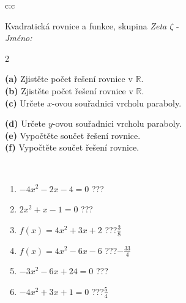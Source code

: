 \documentclass[10pt]{report}
\begin{document}
\begin{tabular}{c:c}
\begin{minipage}[c][104.5mm][t]{0.5\linewidth}
\begin{center}
\vspace{7mm}
{\huge \LARGE Kvadratická rovnice a funkce, skupina \textit{Zeta $\zeta$} -}\\[5mm]
\textit{Jméno:}\phantom{xxxxxxxxxxxxxxxxxxxxxxxxxxxxxxxxxxxxxxxxxxxxxxxxxxxxxxxxxxxxxxxxx}\\[5mm]
\begin{minipage}{0.95\linewidth}
\begin{center}
{\small \begin{multicols}{2} \raggedright
\textbf{(a)} Zjistěte počet řešení rovnice v \(\mathbb{R}\). \\[1mm]
\textbf{(b)} Zjistěte počet řešení rovnice v \(\mathbb{R}\). \\[1mm]
\textbf{(c)} Určete \(x\)-ovou souřadnici vrcholu paraboly. \par \columnbreak
\textbf{(d)} Určete \(y\)-ovou souřadnici vrcholu paraboly. \\[1mm]
\textbf{(e)} Vypočtěte součet řešení rovnice. \\[1mm]
\textbf{(f)} Vypočtěte součet řešení rovnice.
\end{multicols}
}
\end{center}
\end{minipage}
\\[4mm]
\begin{minipage}{0.79\linewidth}
\begin{center}
\begin{varwidth}{\linewidth}
\begin{enumerate}
\Large
\item $-4x^2-2x-4=0$\quad \dotfill\; ???\;\dotfill {}
\item $2x^2+x-1=0$\quad \dotfill\; ???\;\dotfill {}
\item $f(x)=4x^2+3x+2$\quad \dotfill\; ???\;\dotfill \quad $\frac{3}{8}$
\item $f(x)=4x^2-6x-6$\quad \dotfill\; ???\;\dotfill \quad $-\frac{33}{4}$
\item $-3x^2-6x+24=0$\quad \dotfill\; ???\;\dotfill {}
\item $-4x^2+3x+1=0$\quad \dotfill\; ???\;\dotfill \quad $\frac{5}{4}$
\end{enumerate}
\end{varwidth}
\end{center}

\end{minipage}
\end{center}
\end{minipage}
\end{tabular}
\end{document}
